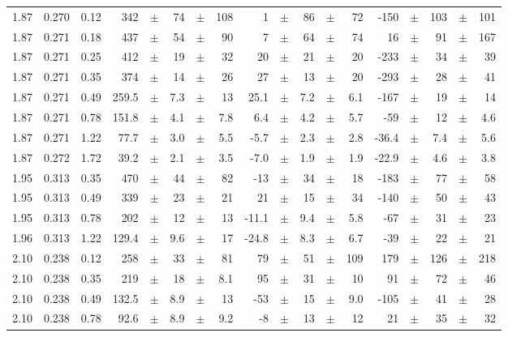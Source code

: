 \documentclass[prc,floatfix,twocolumn,superscriptaddress,letter]{revtex4}
\begin{document}
\begin{longtable}{ccc@{\extracolsep{1cm}}d@{\extracolsep{0pt}}cdcd@{\extracolsep{1cm}}d@{\extracolsep{0pt}}cdcd@{\extracolsep{1cm}}d@{\extracolsep{0pt}}cdcd}
1.87 & 0.270 & 0.12 	&	 342	 &  $\pm$	& 74 &	 $\pm$	& 108 &	 1 &	$\pm$& 	 86 &	$\pm$& 	 72 & -150 & $\pm$ & 103 & 	$\pm$ & 101\\
1.87 & 0.271 & 0.18 	&	 437	 &  $\pm$	& 54 &	 $\pm$	& 90 &	 7 &	$\pm$& 	 64 &	$\pm$& 	 74 & 16 & $\pm$ & 91 & 	$\pm$ & 167\\
1.87 & 0.271 & 0.25 	&	 412	 &  $\pm$	& 19 &	 $\pm$	& 32 &	 20 &	$\pm$& 	 21 &	$\pm$& 	 20 & -233 & $\pm$ & 34 & 	$\pm$ & 39\\
1.87 & 0.271 & 0.35 	&	 374	 &  $\pm$	& 14 &	 $\pm$	& 26 &	 27 &	$\pm$& 	 13 &	$\pm$& 	 20 & -293 & $\pm$ & 28 & 	$\pm$ & 41\\
1.87 & 0.271 & 0.49 	&	 259.5	 &  $\pm$	& 7.3 &	 $\pm$	& 13 &	 25.1 &	$\pm$& 	 7.2 &	$\pm$& 	 6.1 & -167 & $\pm$ & 19 & 	$\pm$ & 14\\
1.87 & 0.271 & 0.78 	&	 151.8	 &  $\pm$	& 4.1 &	 $\pm$	& 7.8 &	 6.4 &	$\pm$& 	 4.2 &	$\pm$& 	 5.7 & -59 & $\pm$ & 12 & 	$\pm$ & 4.6\\
1.87 & 0.271 & 1.22 	&	 77.7	 &  $\pm$	& 3.0 &	 $\pm$	& 5.5 &	 -5.7 &	$\pm$& 	 2.3 &	$\pm$& 	 2.8 & -36.4 & $\pm$ & 7.4 & 	$\pm$ & 5.6\\
1.87 & 0.272 & 1.72 	&	 39.2	 &  $\pm$	& 2.1 &	 $\pm$	& 3.5 &	 -7.0 &	$\pm$& 	 1.9 &	$\pm$& 	 1.9 & -22.9 & $\pm$ & 4.6 & 	$\pm$ & 3.8\\
1.95 & 0.313 & 0.35 	&	 470	 &  $\pm$	& 44 &	 $\pm$	& 82 &	 -13 &	$\pm$& 	 34 &	$\pm$& 	 18 & -183 & $\pm$ & 77 & 	$\pm$ & 58\\
1.95 & 0.313 & 0.49 	&	 339	 &  $\pm$	& 23 &	 $\pm$	& 21 &	 21 &	$\pm$& 	 15 &	$\pm$& 	 34 & -140 & $\pm$ & 50 & 	$\pm$ & 43\\
1.95 & 0.313 & 0.78 	&	 202	 &  $\pm$	& 12 &	 $\pm$	& 13 &	 -11.1 &	$\pm$& 	 9.4 &	$\pm$& 	 5.8 & -67 & $\pm$ & 31 & 	$\pm$ & 23\\
1.96 & 0.313 & 1.22 	&	 129.4	 &  $\pm$	& 9.6 &	 $\pm$	& 17 &	 -24.8 &	$\pm$& 	 8.3 &	$\pm$& 	 6.7 & -39 & $\pm$ & 22 & 	$\pm$ & 21\\
2.10 & 0.238 & 0.12 	&	 258	 &  $\pm$	& 33 &	 $\pm$	& 81 &	 79 &	$\pm$& 	 51 &	$\pm$& 	 109 & 179 & $\pm$ & 126 & 	$\pm$ & 218\\
2.10 & 0.238 & 0.35 	&	 219	 &  $\pm$	& 18 &	 $\pm$	& 8.1 &	 95 &	$\pm$& 	 31 &	$\pm$& 	 10 & 91 & $\pm$ & 72 & 	$\pm$ & 46\\
2.10 & 0.238 & 0.49 	&	 132.5	 &  $\pm$	& 8.9 &	 $\pm$	& 13 &	 -53 &	$\pm$& 	 15 &	$\pm$& 	 9.0 & -105 & $\pm$ & 41 & 	$\pm$ & 28\\
2.10 & 0.238 & 0.78 	&	 92.6	 &  $\pm$	& 8.9 &	 $\pm$	& 9.2 &	 -8 &	$\pm$& 	 13 &	$\pm$& 	 12 & 21 & $\pm$ & 35 & 	$\pm$ & 32\\

\end{longtable}
\end{document}

